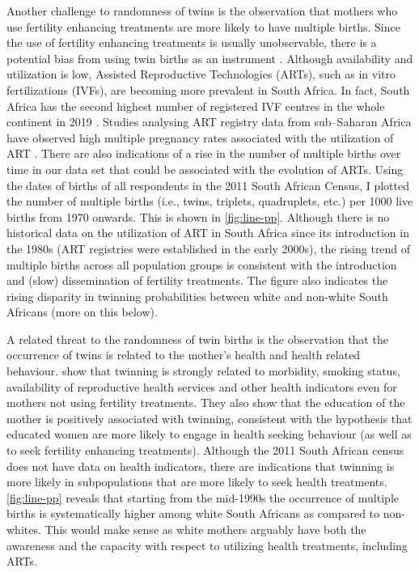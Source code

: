 Another challenge to randomness of twins is the observation that mothers who use fertility enhancing treatments are more likely to have multiple births. Since the use of fertility enhancing treatments is usually unobservable, there is a potential bias from using twin births as an instrument \parencite{braakmann_reconsidering_2016}. Although availability and utilization is low, Assisted Reproductive Technologies (ARTs), such as in vitro fertilizations (IVFs), are becoming more prevalent in South Africa. In fact, South Africa has the second highest number of registered IVF centres in the whole continent in 2019 \parencite{Ombelet2019}. Studies analysing ART registry data from sub–Saharan Africa have observed high multiple pregnancy rates associated with the utilization of ART \parencite{Botha2018,Dyer2019}. There are also indications of a rise in the number of multiple births over time in our data set that could be associated with the evolution of ARTs. Using the dates of births of all respondents in the 2011 South African Census, I plotted the number of multiple births (i.e., twins, triplets, quadruplets, etc.) per 1000 live births from 1970 onwards. This is shown in \autoref{fig:line-pp}. Although there is no historical data on the utilization of ART in South Africa since its introduction in the 1980s (ART registries were established in the early 2000s), the rising trend of multiple births across all population groups is consistent with the introduction and (slow) dissemination of fertility treatments. The figure also indicates the rising disparity in twinning probabilities between white and non-white South Africans (more on this below).


A related threat to the randomness of twin births is the observation that the occurrence of twins is related to the mother's health and health related behaviour. \textcite{bhalotra_twin_2019} show that twinning is strongly related to morbidity, smoking status, availability of reproductive health services and other health indicators even for mothers not using fertility treatments. They also show that the education of the mother is positively associated with twinning, consistent with the hypothesis that educated women are more likely to engage in health seeking behaviour (as well as to seek fertility enhancing treatments). Although the 2011 South African census does not have data on health indicators, there are indications that twinning is more likely in subpopulations that are more likely to seek health treatments. \autoref{fig:line-pp} reveals that starting from the mid-1990s the occurrence of multiple births is systematically higher among white South Africans as compared to non-whites. This would make sense as white mothers arguably have both the awareness and the capacity with respect to utilizing health treatments, including ARTs. 

